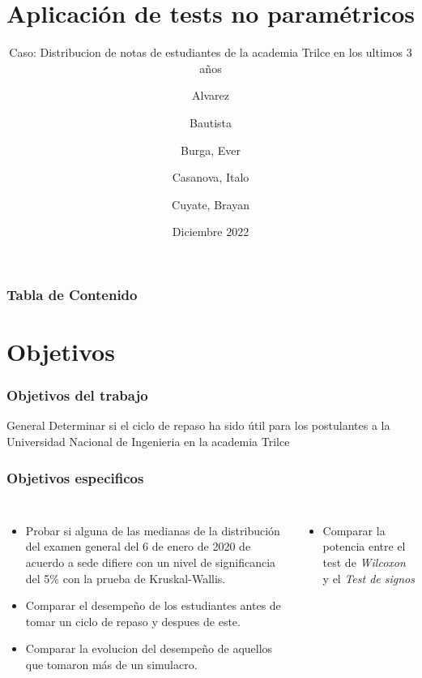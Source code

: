 \documentclass{beamer}
\title[PC3 Estadística Aplicada] %
{Aplicación de tests no paramétricos}
\subtitle{
  Caso: Distribucion de notas de estudiantes de la academia
    Trilce en los ultimos 3 años
}
\author %
{
  Alvarez \and Bautista \and Burga, Ever \and
  Casanova, Italo \and  Cuyate, Brayan
}
\institute
{
  Facultad de Ingenieria Industrial y de Sistemas\\
  \textbf{Universidad Nacional de Ingenieria}
}
\date
{Diciembre 2022}
\begin{document}
\frame{\titlepage}


\begin{frame}
\frametitle{Tabla de Contenido}
\tableofcontents
\end{frame}
\section{Objetivos}

\begin{frame}

\frametitle{Objetivos del trabajo}

\begin{alertblock}{General}
  Determinar si el ciclo de repaso ha sido útil para los postulantes a la
  Universidad Nacional de Ingenieria en la academia Trilce
\end{alertblock}
\end{frame}

\begin{frame}
\frametitle{Objetivos especificos}

\begin{columns}

  \begin{itemize}
      \item Probar si alguna de las medianas de la distribución del examen general del 6 de enero de 2020
      de acuerdo a sede difiere con un nivel de significancia del 5\% con la prueba de Kruskal-Wallis.
      \item Comparar el desempeño de los estudiantes antes de tomar un ciclo
        de repaso y despues de este.
      \item Comparar la evolucion del desempeño de aquellos que tomaron más de un simulacro.

  \end{itemize}


  \begin{itemize}
      \item Comparar la potencia entre el test de \textit{Wilcoxon} y
      el \textit{Test de signos}
  \end{itemize}
\end{columns}
\end{frame}
\end{document}
